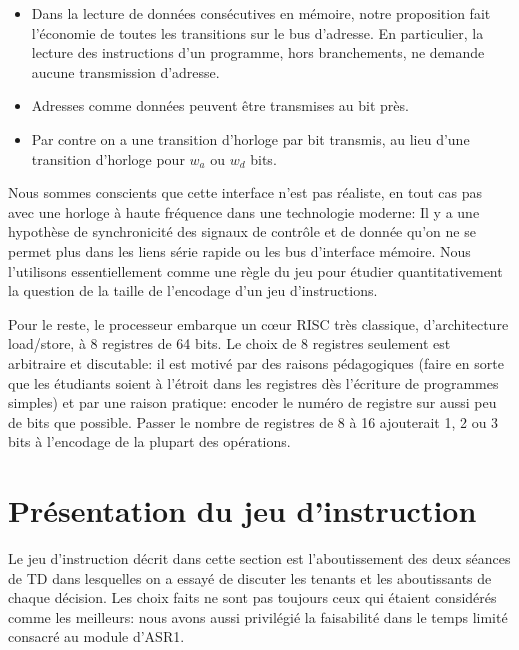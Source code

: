 \documentclass[architecture]{compas2018}
\newcommand{\todo}[1]{\textcolor{red}{TODO: #1}}
\begin{document}
\begin{itemize}
\item Dans la lecture de données consécutives en mémoire, notre proposition fait l'économie de toutes les transitions sur le bus d'adresse.
  En particulier, la lecture des instructions d'un programme, hors branchements,  ne demande aucune transmission d'adresse.
\item Adresses comme données peuvent être transmises au bit près.
\item Par contre on a une transition d'horloge par bit transmis, au lieu d'une transition d'horloge pour $w_a$ ou $w_d$ bits.
\end{itemize}
\fi
Nous sommes conscients que cette interface n'est  pas réaliste, en tout cas pas avec une horloge à haute fréquence dans une technologie moderne:
Il y a une hypothèse de synchronicité des signaux de contrôle et de donnée qu'on ne se permet plus dans les liens série rapide ou les bus d'interface mémoire.
Nous l'utilisons essentiellement comme une règle du jeu pour étudier quantitativement  la question de la taille de l'encodage d'un jeu d'instructions.

Pour le reste, le processeur embarque un c\oe ur RISC très classique, d'architecture load/store, à 8 registres de 64 bits.  
Le choix de 8 registres seulement est arbitraire et discutable: il est motivé par des raisons pédagogiques (faire en sorte que les étudiants soient à l'étroit dans les registres  dès l'écriture de programmes simples) et par une raison pratique: encoder le numéro de registre sur aussi peu de bits que possible. Passer le nombre de registres de 8 à 16 ajouterait 1, 2 ou 3 bits à l'encodage de la plupart des opérations.


\section{Présentation du jeu d'instruction}
Le jeu d'instruction décrit dans cette section est l'aboutissement des deux séances de TD dans lesquelles on a essayé de discuter les tenants et les aboutissants de chaque décision.
Les choix faits ne sont pas toujours ceux qui étaient considérés comme les meilleurs: nous avons aussi privilégié la faisabilité dans le temps limité consacré au module d'ASR1.
\end{document}
